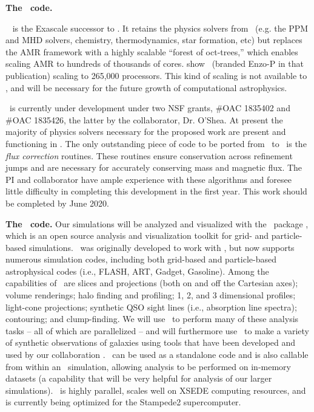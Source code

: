 {\large \textbf{The \enzoe\ code.}}


\enzoe\ \citep{Bordner12, Bordner18} is the Exascale successor to \enzo. 
It retains the physics solvers from \enzo\ (e.g. the PPM and MHD solvers,
chemistry, thermodynamics, star formation, etc) but replaces the AMR framework
with a highly scalable ``forest of oct-trees,'' which enables scaling AMR to
hundreds of thousands of cores. \citet{Bordner18} show \enzoe\ (branded Enzo-P
in that publication) scaling to 265,000 processors.  This kind of scaling is not
available to \enzo, and will be necessary for the future growth of computational
astrophysics.

\enzoe\ is currently under development under two NSF grants, \#OAC 1835402 and
\#OAC 1835426, the latter  by the
collaborator, Dr. O'Shea.  At present the majority of physics solvers necessary
for the proposed work are
present and functioning in \enzoe.  The only outstanding piece of code
to be ported from \enzo\ to \enzoe\ is the \emph{flux correction} routines.
These routines ensure conservation across refinement jumps and are necessary for
accurately conserving mass and magnetic flux.  The PI and collaborator have ample experience with
these algorithms and foresee little difficulty in completing this development in
the first year.  This work should be completed by June 2020.

\vspace{2mm}
\noindent
{\large \textbf{The \yt\ code.}}
Our simulations will be analyzed and visualized with the \yt\ package
\cite[][\url{http://yt-project.org}]{Turk11}, which is an open source
analysis and visualization toolkit for grid- and particle-based
simulations.  \yt\ was originally developed to work with \enzo, but
now supports numerous simulation codes, including both grid-based and
particle-based astrophysical codes (i.e., FLASH, ART, Gadget,
Gasoline).  Among the capabilities of \yt\ are slices and projections
(both on and off the Cartesian axes); volume renderings; halo finding
and profiling; 1, 2, and 3 dimensional profiles; light-cone
projections; synthetic QSO sight lines (i.e., absorption line spectra);
contouring; and clump-finding.  We will use \yt\ to perform many of
these analysis tasks -- all of which are parallelized -- and will
furthermore use \yt\ to make a variety of synthetic observations of
galaxies using tools that have been developed and used by our
collaboration \citep[e.g.,][]{Barrow17,Barrow17_FL2}.  \yt\ can be 
used as a standalone code and is also
callable from within an \enzo\ simulation, allowing analysis to be
performed on in-memory datasets (a capability that will be very
helpful for analysis of our larger simulations).  \yt\ is highly
parallel, scales well on XSEDE computing resources, and is currently
being optimized for the Stampede2 supercomputer.

